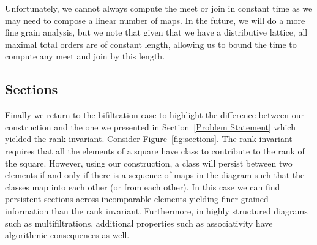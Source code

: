 \documentclass[10pt]{amsart}
\begin{document}
Unfortunately, we cannot always compute the meet or join in constant time as we may need to compose a linear number of maps. In the future, we will do a more fine grain analysis, but we note that given that we have a
distributive lattice, all maximal total orders are of constant length, allowing us to bound the time to compute any meet and join by this length. 




\subsection{Sections}

Finally we return to the bifiltration case to highlight the difference between our construction and the one we presented in Section~\ref{Problem Statement} which yielded the rank invariant. 
Consider Figure~\ref{fig:sections}. The rank invariant requires that all the elements of a square have class to contribute to the rank of the square. 
However, using our construction, a class will persist between two elements if and only if there is a sequence of maps in the diagram such that the classes map into each other (or from each other). 
In this case we can find persistent sections across incomparable elements yielding finer grained information than the rank invariant.
Furthermore, in highly structured diagrams such as multifiltrations, additional properties such as associativity have algorithmic consequences as well. 
\end{document}
